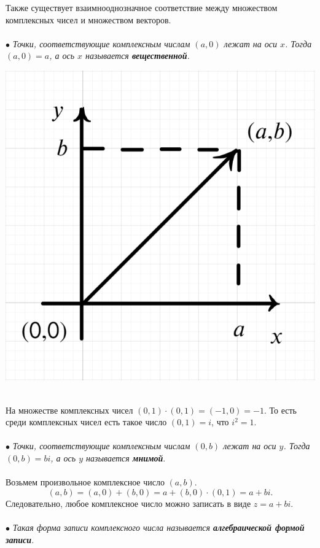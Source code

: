 \documentclass[a4paper, 12pt]{article}
\begin{document}
\noindent
\parbox[b][4cm][t]{110mm}{
Также существует взаимнооднозначное соответствие между множеством комплексных чисел и множеством векторов.\\\\
$\bullet$\textit{ Точки, соответствующие комплексным числам $(a,0)$ лежат на оси $x$. Тогда $(a,0) = a$, а ось $x$ называется \textbf{вещественной}.}}
\hfill
\parbox[b][5cm][t]{55mm}{
	\includegraphics[scale=0.25]{images/002.png}}\\
На множестве комплексных чисел $(0,1)\cdot (0,1) = (-1,0) = -1.$ То есть среди комплексных чисел есть такое число $(0,1) = i$, что $i^2 = 1$.\\\\
$\bullet$ \textit{Точки, соответствующие комплексным числам $(0,b)$ лежат на оси $y$. Тогда $(0,b) = bi$, а ось $y$ называется \textbf{мнимой}}.\\\\
Возьмем произвольное комплексное число $(a,b)$.
$$(a,b) = (a,0) + (b,0) = a+ (b,0)\cdot (0,1) = a+bi.$$
Следовательно, любое комплексное число можно записать в виде $z = a+bi$.\\\\
$\bullet$ \textit{Такая форма записи комплексного числа называется \textbf{алгебраической формой записи}.}\\\\
\end{document}
